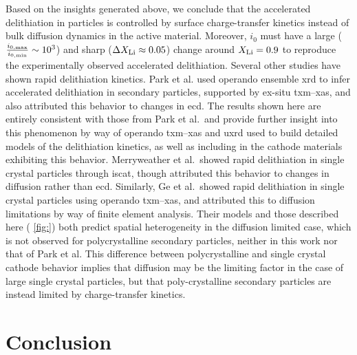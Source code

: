\documentclass{article}
\begin{document}
Based on the insights generated above, we conclude that the
accelerated delithiation in \nca{} particles is controlled by surface
charge-transfer kinetics instead of bulk  diffusion dynamics
in the active material. Moreover, $i_0$ must have a large ($\frac{
  i_{0,\rm{max}} }{ i_{0,\rm{min}} } \sim 10^3$) and sharp ($\Delta
X_{\rm{Li}} \approx 0.05$) change around $X_{\rm{Li}} = 0.9$ to
reproduce the experimentally observed accelerated
delithiation. Several other studies have shown rapid delithiation
kinetics. Park et al.\cite{chueh2021} used operando ensemble \gls{xrd}
to infer accelerated delithiation in \nmc{} secondary particles,
supported by ex-situ \gls{txm}--\gls{xas}, and also attributed this
behavior to changes in \gls{ecd}. The results shown here are entirely
consistent with those from Park et al.\ and provide further insight
into this phenomenon by way of operando \gls{txm}--\gls{xas} and
\gls{uxrd} used to build detailed models of the delithiation kinetics,
as well as including \nca{} in the cathode materials exhibiting this
behavior. Merryweather et al.\cite{rao2021}\ showed rapid delithiation
in  single crystal particles through \gls{iscat}, though
attributed this behavior to changes in  diffusion rather than
\gls{ecd}. Similarly, Ge et al.\cite{wang2020-6}\ showed rapid
delithiation in \nmc{} single crystal particles using operando
\gls{txm}--\gls{xas}, and attributed this to  diffusion
limitations by way of finite element analysis. Their models and those
described here ( \ref{fig:}) both predict spatial
heterogeneity in the diffusion limited case\cite{wang2020-6}, which is
not observed for polycrystalline secondary particles, neither in this
work nor that of Park et al\cite{chueh2021}. This difference between
polycrystalline and single crystal cathode behavior implies that
 diffusion may be the limiting factor in the case of large
single crystal particles, but that poly-crystalline secondary
particles are instead limited by charge-transfer kinetics.

\section{Conclusion}
\end{document}
